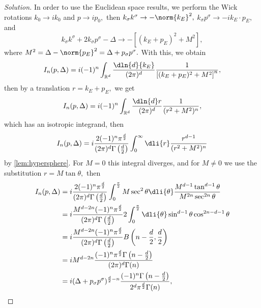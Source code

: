 \begin{proof}[Solution]
   In order to use the Euclidean space results, we perform the Wick rotations \(k_0 \to ik_0\) and \(p \to ip_0,\) then \(k_\sigma k^\sigma \to -\norm{k_E}^2,\) \(k_\sigma p^\sigma \to -i k_E \cdot p_E,\) and
   \begin{equation*}
      k_\sigma k^\sigma + 2 k_\sigma p^\sigma - \Delta \to -\left[(k_E + p_E)^2 + M^2\right],
   \end{equation*}
   where \(M^2 = \Delta - \norm{p_E}^2 = \Delta + p_\sigma p^\sigma.\) With this, we obtain
   \begin{equation*}
      I_n(p, \Delta) = i(-1)^n\int_{\mathbb{R}^d}\frac{\dln{d}{k_E}}{(2\pi)^d} \frac{1}{\left[(k_E + p_E)^2 + M^2\right]^n},
   \end{equation*}
   then by a translation \(r = k_E + p_E,\) we get
   \begin{equation*}
      I_{n}(p, \Delta) = i(-1)^n\int_{\mathbb{R}^d} \frac{\dln{d}r}{(2\pi)^d} \frac{1}{(r^2 + M^2)^n},
   \end{equation*}
   which has an isotropic integrand, then
   \begin{equation*}
      I_{n}(p, \Delta) = i\frac{2(-1)^n \pi^{\frac{d}{2}}}{(2\pi)^d \Gamma\left(\frac{d}{2}\right)} \int_{0}^\infty \dli{r} \frac{r^{d-1}}{(r^2 + M^2)^n}
   \end{equation*}
   by \cref{lem:hypersphere}. For \(M = 0\) this integral diverges, and for \(M \neq 0\) we use the substitution \(r = M \tan\theta,\) then
   \begin{align*}
      I_{n}(p, \Delta) &= i\frac{2(-1)^n \pi^{\frac{d}{2}}}{(2\pi)^d \Gamma\left(\frac{d}{2}\right)} \int_{0}^{\frac\pi2} M \sec^2{\theta}\dli{\theta} \frac{M^{d - 1} \tan^{d - 1}\theta}{M^{2n} \sec^{2n}\theta}\\
                                   &= i\frac{M^{d - 2n} (-1)^n \pi^{\frac{d}{2}}}{(2\pi)^d \Gamma\left(\frac{d}{2}\right)} 2\int_0^{\frac\pi2} \dli{\theta} \sin^{d - 1}\theta \cos^{2n - d - 1}\theta\\
                                   &= i\frac{M^{d - 2n} (-1)^n \pi^{\frac{d}{2}}}{(2\pi)^d \Gamma\left(\frac{d}{2}\right)} B\left(n - \frac{d}{2}, \frac{d}{2}\right)\\
                                   &= iM^{d - 2n}\frac{(-1)^n \pi^{\frac{d}{2}}\Gamma\left(n - \frac{d}{2}\right)}{(2\pi)^d \Gamma(n)}\\
                                   &= i(\Delta + p_\sigma p^\sigma)^{\frac{d}{2}-n} \frac{(-1)^n \Gamma\left(n - \frac{d}{2}\right)}{2^d \pi^{\frac{d}{2}} \Gamma(n)},
   \end{align*}

\end{proof}
